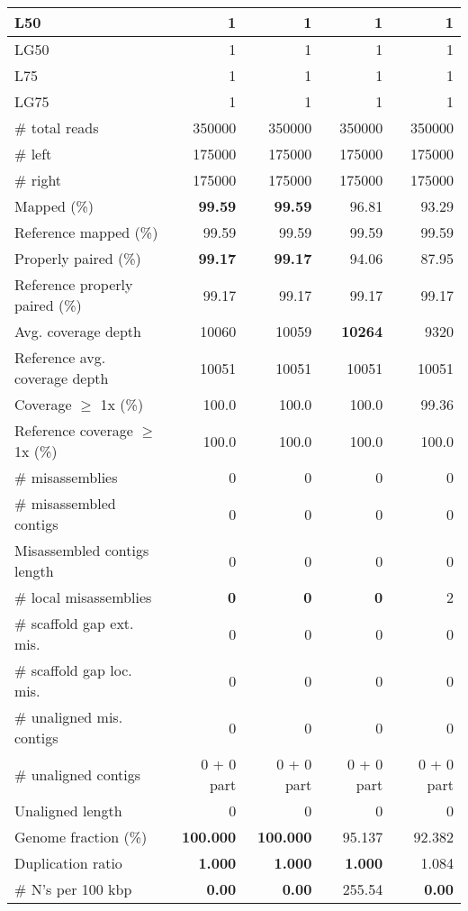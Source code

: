\documentclass[12pt,a4paper]{article}
\begin{document}
\begin{table}[ht]
\begin{center}
\begin{tabular}{|l*{4}{|r}|}
L50 & 1 & 1 & 1 & 1 \\ \hline
LG50 & 1 & 1 & 1 & 1 \\ \hline
L75 & 1 & 1 & 1 & 1 \\ \hline
LG75 & 1 & 1 & 1 & 1 \\ \hline
\# total reads & 350000 & 350000 & 350000 & 350000 \\ \hline
\# left & 175000 & 175000 & 175000 & 175000 \\ \hline
\# right & 175000 & 175000 & 175000 & 175000 \\ \hline
Mapped (\%) & {\bf 99.59} & {\bf 99.59} & 96.81 & 93.29 \\ \hline
Reference mapped (\%) & 99.59 & 99.59 & 99.59 & 99.59 \\ \hline
Properly paired (\%) & {\bf 99.17} & {\bf 99.17} & 94.06 & 87.95 \\ \hline
Reference properly paired (\%) & 99.17 & 99.17 & 99.17 & 99.17 \\ \hline
Avg. coverage depth & 10060 & 10059 & {\bf 10264} & 9320 \\ \hline
Reference avg. coverage depth & 10051 & 10051 & 10051 & 10051 \\ \hline
Coverage $\geq$ 1x (\%) & 100.0 & 100.0 & 100.0 & 99.36 \\ \hline
Reference coverage $\geq$ 1x (\%) & 100.0 & 100.0 & 100.0 & 100.0 \\ \hline
\# misassemblies & 0 & 0 & 0 & 0 \\ \hline
\# misassembled contigs & 0 & 0 & 0 & 0 \\ \hline
Misassembled contigs length & 0 & 0 & 0 & 0 \\ \hline
\# local misassemblies & {\bf 0} & {\bf 0} & {\bf 0} & 2 \\ \hline
\# scaffold gap ext. mis. & 0 & 0 & 0 & 0 \\ \hline
\# scaffold gap loc. mis. & 0 & 0 & 0 & 0 \\ \hline
\# unaligned mis. contigs & 0 & 0 & 0 & 0 \\ \hline
\# unaligned contigs & 0 + 0 part & 0 + 0 part & 0 + 0 part & 0 + 0 part \\ \hline
Unaligned length & 0 & 0 & 0 & 0 \\ \hline
Genome fraction (\%) & {\bf 100.000} & {\bf 100.000} & 95.137 & 92.382 \\ \hline
Duplication ratio & {\bf 1.000} & {\bf 1.000} & {\bf 1.000} & 1.084 \\ \hline
\# N's per 100 kbp & {\bf 0.00} & {\bf 0.00} & 255.54 & {\bf 0.00} \\ \hline

\end{tabular}
\end{center}
\end{table}
\end{document}
